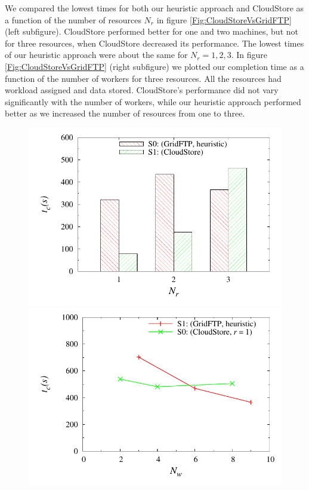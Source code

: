 \documentclass{rspublic}
\begin{document}
We compared the lowest times for both our heuristic approach and
CloudStore as a function of the number of resources $N_r$ in figure
\ref{Fig:CloudStoreVsGridFTP} (left subfigure). CloudStore performed better for one and
two machines, but not for three resources, when CloudStore decreased its
performance. The lowest times of our heuristic approach were about the
same for $N_r=1,2,3$. In figure \ref{Fig:CloudStoreVsGridFTP} (right subfigure) we
plotted our completion time as a function of the number of workers for
three resources. All the resources had workload assigned and data
stored. CloudStore's performance did not vary significantly with the
number of workers, while our heuristic approach performed better as we
increased the number of resources from one to three.

\begin{figure}
\begin{center}
\subfigure
{
\includegraphics[scale=0.48]{data/graphs/NumberResourcesFigure_histogram}
\label{Fig:CloudStoreVsGridFTP:a}
}
\subfigure
{
\includegraphics[scale=0.48]{data/graphs/CloudStoreVsGridFTPFigure}
}
\end{center}
\end{figure}
\end{document}
